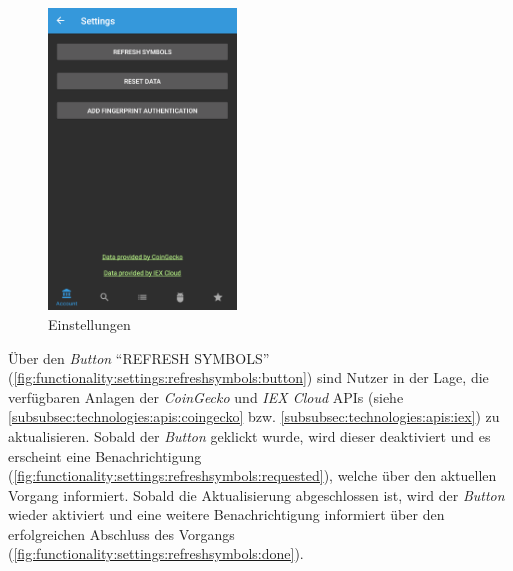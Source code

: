 \documentclass[a4paper]{article}
\begin{document}
\begin{figure}[H]
	\centering
	\includegraphics[width=.5\textwidth,height=8cm,keepaspectratio]{./images/settings/raw.png}
	\caption{Einstellungen}
	\label{fig:functionality:settings}
\end{figure}


Über den \textit{Button} "`REFRESH SYMBOLS"' (\autoref{fig:functionality:settings:refreshsymbols:button}) sind Nutzer in der Lage, die verfügbaren Anlagen der \textit{CoinGecko} und \textit{IEX Cloud} APIs (siehe \autoref{subsubsec:technologies:apis:coingecko} bzw. \autoref{subsubsec:technologies:apis:iex}) zu aktualisieren.
Sobald der \textit{Button} geklickt wurde, wird dieser deaktiviert und es erscheint eine Benachrichtigung (\autoref{fig:functionality:settings:refreshsymbols:requested}), welche über den aktuellen Vorgang informiert.
Sobald die Aktualisierung abgeschlossen ist, wird der \textit{Button} wieder aktiviert und eine weitere Benachrichtigung informiert über den erfolgreichen Abschluss des Vorgangs (\autoref{fig:functionality:settings:refreshsymbols:done}).
\end{document}
